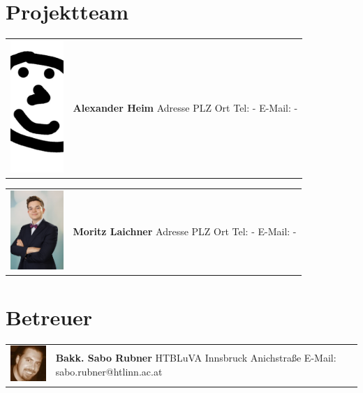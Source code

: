 \section*{Projektteam}

\begin{tabular}[t]{p{2cm} p{5cm}}
    \vspace{0pt}
    \includegraphics[width=2cm]{../images/alex.jpg}
    &
    \vspace{0pt}
    \textbf{Alexander Heim}
    \newline Adresse
    \newline PLZ Ort
    \newline
    \newline Tel: -
    \newline E-Mail: -
    \\
\end{tabular}

\begin{tabular}[t]{p{2cm} p{5cm}}
    \vspace{0pt}
    \includegraphics[width=2cm]{../images/moritz.jpg}
    &
    \vspace{0pt}
    \textbf{Moritz Laichner}
    \newline Adresse
    \newline PLZ Ort
    \newline
    \newline Tel: -
    \newline E-Mail: -
    \\
\end{tabular}


\section*{Betreuer}

\begin{tabular}[t]{p{2cm} p{7cm}}
    \vspace{0pt}
    \includegraphics[width=2cm]{../images/sabo.jpg}
    &
    \vspace{0pt}
    \textbf{Bakk. Sabo Rubner}
    \newline HTBLuVA Innsbruck Anichstraße
    \newline
    \newline E-Mail: sabo.rubner@htlinn.ac.at
    \\
\end{tabular}

\newpage